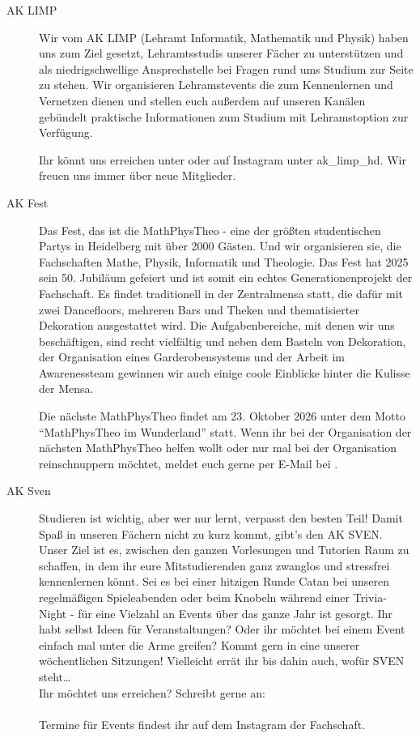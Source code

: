 \begin{description}
      \item[AK LIMP]
        Wir vom AK LIMP (Lehramt Informatik, Mathematik und Physik) haben uns zum Ziel gesetzt, Lehramtsstudis unserer Fächer zu unterstützen und als niedrigschwellige Ansprechstelle bei Fragen rund ums Studium zur Seite zu stehen. Wir organisieren Lehramstevents die zum Kennenlernen und Vernetzen dienen und stellen euch außerdem auf unseren Kanälen gebündelt praktische Informationen zum Studium mit Lehramstoption zur Verfügung.

Ihr könnt uns erreichen unter  oder auf Instagram unter ak\_limp\_hd. Wir freuen uns immer über neue Mitglieder.
	
	\item[AK Fest] Das Fest, das ist die MathPhysTheo - eine der größten studentischen Partys in Heidelberg mit über 2000 Gästen. Und wir organisieren sie, die Fachschaften Mathe, Physik, Informatik und Theologie. Das Fest hat 2025 sein 50. Jubiläum gefeiert und ist somit ein echtes Generationenprojekt der Fachschaft. Es findet traditionell in der Zentralmensa statt, die dafür mit zwei Dancefloors, mehreren Bars und Theken und thematisierter Dekoration ausgestattet wird. Die Aufgabenbereiche, mit denen wir uns beschäftigen, sind recht vielfältig und neben dem Basteln von Dekoration, der Organisation eines Garderobensystems und der Arbeit im Awarenessteam gewinnen wir auch einige coole Einblicke hinter die Kulisse der Mensa. 
	
	Die nächste MathPhysTheo findet am 23. Oktober 2026 unter dem Motto ``MathPhysTheo im Wunderland'' statt. Wenn ihr bei der Organisation der nächsten MathPhysTheo helfen wollt oder nur mal bei der Organisation reinschnuppern möchtet, meldet euch gerne per E-Mail bei .
	
	\label{AK_Sven}
	\item[AK Sven]
	Studieren ist wichtig, aber wer nur lernt, verpasst den besten Teil! Damit Spaß in unseren Fächern nicht zu kurz kommt, gibt's den AK SVEN. Unser Ziel ist es, zwischen den ganzen Vorlesungen und Tutorien Raum zu schaffen, in dem ihr eure Mitstudierenden ganz zwanglos und stressfrei kennenlernen könnt. Sei es bei einer hitzigen Runde Catan bei unseren regelmäßigen Spieleabenden oder beim Knobeln während einer Trivia-Night - für eine Vielzahl an Events über das ganze Jahr ist gesorgt. Ihr habt selbst Ideen für Veranstaltungen? Oder ihr  möchtet bei einem Event einfach mal unter die Arme greifen? Kommt gern in eine unserer wöchentlichen Sitzungen! Vielleicht errät ihr bis dahin auch, wofür SVEN steht\dots \\
	Ihr möchtet uns erreichen? Schreibt gerne an: \\  \\
	Termine für Events findest ihr auf dem Instagram der Fachschaft.
	

\end{description}
